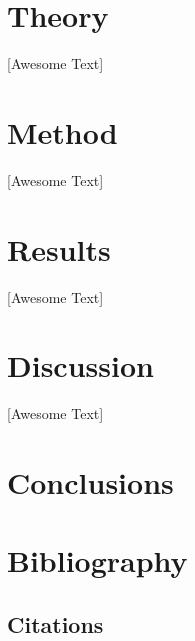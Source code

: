 \documentclass{acm_proc_article-sp}
\begin{document}
\section{Theory}
[Awesome Text]

\section{Method}
[Awesome Text]

\section{Results}
[Awesome Text]

\section{Discussion}
[Awesome Text]

\section{Conclusions}

\section{Bibliography}

\subsection{Citations}



%
%

\end{document}
